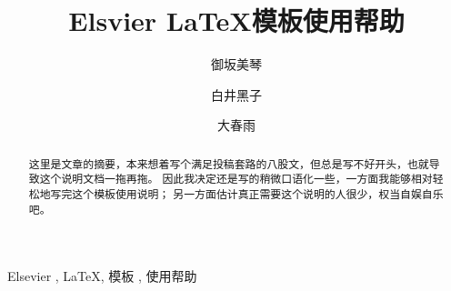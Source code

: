 \documentclass[preprint,5p,twocolumn]{elsarticle}
\begin{document}
    
    \begin{frontmatter}
        \title{Elsvier \LaTeX 模板使用帮助}

        \author[1]{御坂美琴}
        \author[1]{白井黑子}
        \author[2]{大春雨 }



        \begin{abstract}
            这里是文章的摘要，本来想着写个满足投稿套路的八股文，但总是写不好开头，也就导致这个说明文档一拖再拖。
            因此我决定还是写的稍微口语化一些，一方面我能够相对轻松地写完这个模板使用说明；
            另一方面估计真正需要这个说明的人很少，权当自娱自乐吧。


        \end{abstract}

        \begin{keyword}
            Elsevier \sep 
            \LaTeX \sep 
            模板 \sep
            使用帮助
        \end{keyword}
    \end{frontmatter}


    

    
\end{document}

